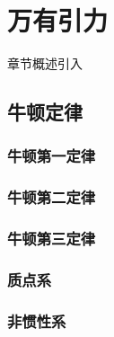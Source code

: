 \chapter{万有引力}\label{3}

章节概述引入

\section{牛顿定律}\label{3-1}

\subsection{牛顿第一定律}\label{3-1-1}

\subsection{牛顿第二定律}\label{3-1-2}

\subsection{牛顿第三定律}\label{3-1-3}

\subsection{质点系}\label{3-1-4}

\subsection{非惯性系}\label{3-1-5}